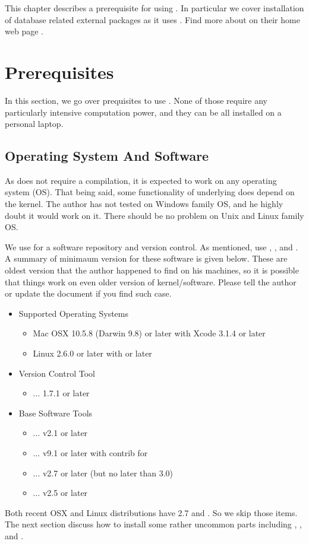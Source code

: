 
This chapter describes a prerequisite for using {\pubs}. In particular we
cover installation of database related external packages as it uses {\psql}.
Find more about {\psql} on their home web page \cite{PSQLHome}.

\section{Prerequisites}
In this section, we go over prequisites to use {\pubs}. None of those require any
particularly intensive computation power, and they can be all installed on a 
personal laptop.

\subsection{Operating System And Software}
As {\pubs} does not require a compilation, it is expected to work on any operating system (OS).
That being said, some functionality of underlying {\python} does depend on the kernel. 
The author has not tested on Windows family OS, and he highly doubt it would work on it. 
There should be no problem on Unix and Linux family OS. 

We use {\git} for a software repository and version control. As mentioned, {\pubs} use
{\php}, {\psql}, and {\python}. A summary of minimaum version for these software is given
below. These are oldest version that the author happened to find on his machines, so it
is possible that things work on even older version of kernel/software. Please tell the 
author or update the document if you find such case.

\begin{itemize}
\item Supported Operating Systems
    \begin{itemize}
    \item Mac OSX 10.5.8 (Darwin 9.8) or later with Xcode 3.1.4 or later
    \item Linux 2.6.0 or later with  or later
    \end{itemize}
\item Version Control Tool
    \begin{itemize}
    \item {\git} $\ldots$ 1.7.1 or later
    \end{itemize}
\item Base Software Tools
    \begin{itemize}
    \item {\php} $\ldots$ v2.1 or later
    \item {\psql}$\ldots$  v9.1 or later with {\ttfamily contrib} for {\hstore}
    \item {\python} $\ldots$ v2.7 or later (but no later than 3.0)
    \item {\psycopg} $\ldots$ v2.5 or later
    \end{itemize}
\end{itemize}
Both recent OSX and Linux distributions have {\python} 2.7 and {\git}. So we skip
those items. The next section discuss how to install some rather uncommon parts
including {\psql}, {\hstore}, and {\psycopg}.

